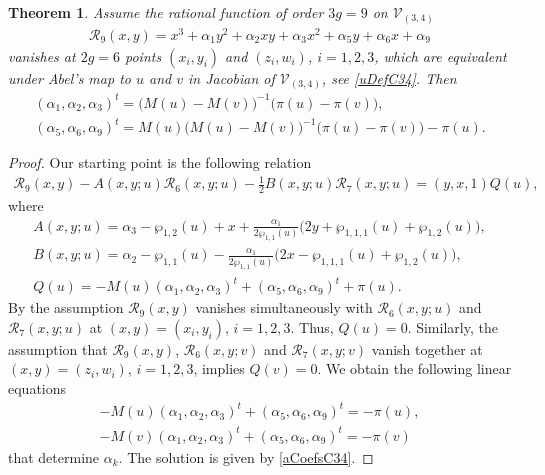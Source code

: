 \documentclass[pdftex]{sigma}
\numberwithin{equation}{section}
\newtheorem{Theorem}{Theorem}[section]
\begin{document}
\begin{Theorem}\label{T:R9polyC34}
 Assume the rational function of order $3g=9$ on $\mathcal{V}_{(3,4)}$
\begin{gather}\label{R9polyC34}
\mathcal{R}_9(x,y) = x^3 + \alpha_1 y^2 + \alpha_2 x y + \alpha_3 x^2 + \alpha_5 y + \alpha_6 x + \alpha_9
\end{gather}
vanishes at $2g=6$ points $(x_i,y_i)$ and $(z_i,w_i)$, $i=1,2,3$, which are equivalent under Abel's map to $u$ and $v$ in Jacobian of $\mathcal{V}_{(3,4)}$, see \eqref{uDefC34}. Then
\begin{gather}
(\alpha_1,\alpha_2,\alpha_3)^t = \big(M(u)-M(v)\big)^{-1} \big(\pi(u)-\pi(v)\big),\nonumber\\
(\alpha_5,\alpha_6,\alpha_9)^t = M(u) \big(M(u)-M(v)\big)^{-1} \big(\pi(u)-\pi(v)\big) - \pi(u).\label{aCoefsC34}
\end{gather}
\end{Theorem}

\begin{proof}Our starting point is the following relation
\begin{gather*}
 \mathcal{R}_9(x,y) - A(x,y;u) \mathcal{R}_6(x,y;u) - \tfrac{1}{2} B(x,y;u) \mathcal{R}_7(x,y;u) = (y,x,1) Q(u),
\end{gather*}
where
 \begin{gather*}
 A(x,y;u) = \alpha_3 - \wp_{1,2}(u) + x + \frac{\alpha_1}{2\wp_{1,1}(u)} \big(2 y + \wp_{1,1,1}(u) + \wp_{1,2}(u)\big),\\
 B(x,y;u) = \alpha_2-\wp_{1,1}(u) -\frac{\alpha_1}{2\wp_{1,1}(u)} \big(2x - \wp_{1,1,1}(u) + \wp_{1,2}(u)\big), \\
 Q(u) = -M(u)(\alpha_1,\alpha_2,\alpha_3)^t + (\alpha_5,\alpha_6,\alpha_9)^t + \pi(u).
\end{gather*}
By the assumption $\mathcal{R}_9(x,y)$ vanishes simultaneously with $\mathcal{R}_6(x,y;u)$ and $\mathcal{R}_7(x,y;u)$ at $(x,y)=(x_i,y_i)$, $i=1,2,3$. Thus, $Q(u)=0$. Similarly, the assumption that $\mathcal{R}_9(x,y)$, $\mathcal{R}_6(x,y;v)$ and $\mathcal{R}_7(x,y;v)$ vanish together at $(x,y)=(z_i,w_i)$, $i=1,2,3$, implies $Q(v)=0$. We obtain the following linear equations
\begin{gather*}
 -M(u)(\alpha_1,\alpha_2,\alpha_3)^t + (\alpha_5,\alpha_6,\alpha_9)^t = -\pi(u),\\
 -M(v)(\alpha_1,\alpha_2,\alpha_3)^t + (\alpha_5,\alpha_6,\alpha_9)^t = -\pi(v)
\end{gather*}
that determine $\alpha_k$. The solution is given by \eqref{aCoefsC34}.
\end{proof}
\end{document}
